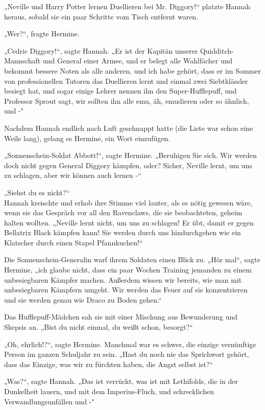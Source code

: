 {„Neville und Harry Potter lernen Duellieren bei Mr. Diggory!“ platzte Hannah heraus, sobald sie ein paar Schritte vom Tisch entfernt waren.

„Wer?“, fragte Hermine.

„Cedric Diggory!“, sagte Hannah. „Er ist der Kapitän unserer Quidditch-Mannschaft und General einer Armee, und er belegt alle Wahlfächer und bekommt bessere Noten als alle anderen, und ich habe gehört, dass er im Sommer von professionellen Tutoren das Duellieren lernt und einmal zwei Siebtklässler besiegt hat, und sogar einige Lehrer nennen ihn den Super-Hufflepuff, und Professor Sprout sagt, wir sollten ihn alle emu, äh, emudieren oder so ähnlich, und -"

Nachdem Hannah endlich nach Luft geschnappt hatte (die Liste war schon eine Weile lang), gelang es Hermine, ein Wort einzufügen.

„Sonnenschein-Soldat Abbott!“, sagte Hermine. „Beruhigen Sie sich. Wir werden doch nicht gegen General Diggory kämpfen, oder? Sicher, Neville lernt, um uns zu schlagen, aber wir können auch lernen -“

„Siehst du es nicht?“\\ Hannah kreischte und erhob ihre Stimme viel lauter, als es nötig gewesen wäre, wenn sie das Gespräch vor all den Ravenclaws, die sie beobachteten, geheim halten wollten. „Neville lernt nicht, um uns zu schlagen! Er übt, damit er gegen Bellatrix Black kämpfen kann! Sie werden durch uns hindurchgehen wie ein Klatscher durch einen Stapel Pfannkuchen!“

Die Sonnenschein-Generalin warf ihrem Soldaten einen Blick zu. „Hör mal“, sagte Hermine, „ich glaube nicht, dass ein paar Wochen Training jemanden zu einem unbesiegbaren Kämpfer machen. Außerdem wissen wir bereits, wie man mit unbesiegbaren Kämpfern umgeht. Wir werden das Feuer auf sie konzentrieren und sie werden genau wie Draco zu Boden gehen.“

Das Hufflepuff-Mädchen sah sie mit einer Mischung aus Bewunderung und Skepsis an. „Bist du nicht einmal, du weißt schon, besorgt?“

„Oh, ehrlich!?“, sagte Hermine. Manchmal war es schwer, die einzige vernünftige Person im ganzen Schuljahr zu sein. „Hast du noch nie das Sprichwort gehört, dass das Einzige, was wir zu fürchten haben, die Angst selbst ist?“

„Was?“, sagte Hannah. „Das ist verrückt, was ist mit Lethifolds, die in der Dunkelheit lauern, und mit dem Imperius-Fluch, und schrecklichen Verwandlungsunfällen und -"

}
